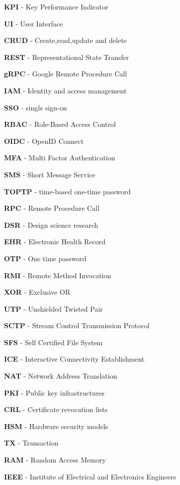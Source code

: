 \textbf{KPI} - Key Performance Indicator

\textbf{UI} - User Interface

\textbf{CRUD} - Create,read,update and delete

\textbf{REST} - Representational State Transfer

\textbf{gRPC} - Google Remote Procedure Call

\textbf{IAM} - Identity and access management

\textbf{SSO} - single sign-on

\textbf{RBAC} - Role-Based Access Control

\textbf{OIDC} - OpenID Connect 

\textbf{MFA} - Multi Factor Authentication

\textbf{SMS} - Short Message Service

\textbf{TOPTP} - time-based one-time password

\textbf{RPC} - Remote Procedure Call

\textbf{DSR} - Design science research

\textbf{EHR} - Electronic Health Record

\textbf{OTP} - One time password

\textbf{RMI} - Remote Method Invocation

\textbf{XOR} - Exclusive OR

\textbf{UTP} - Unshielded Twisted Pair

\textbf{SCTP} - Stream Control Transmission Protocol

\textbf{SFS} - Self Certified File System

\textbf{ICE} - Interactive Connectivity Establishment

\textbf{NAT} - Network Address Translation

\textbf{PKI} - Public key infrastructures

\textbf{CRL} - Certificate revocation lists

\textbf{HSM} - Hardware security models

\textbf{TX} - Transaction

\textbf{RAM} - Random Access Memory

\textbf{IEEE} - Institute of Electrical and Electronics Engineers

\newpage